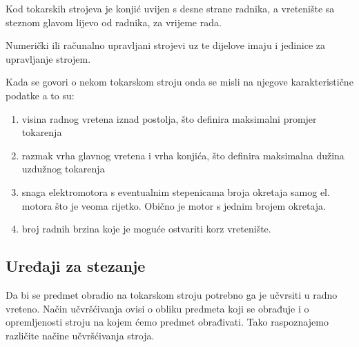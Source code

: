 \documentclass[a4paper,12pt]{article}
\numberwithin{figure}{section}
\begin{document}
Kod tokarskih strojeva je konjić uvijen s desne strane radnika, a vretenište sa steznom glavom lijevo od radnika, za vrijeme rada.\par
Numerički ili računalno upravljani strojevi uz te dijelove imaju i jedinice za upravljanje strojem. \par
Kada se govori o nekom tokarskom stroju onda se misli na njegove karakteristične podatke a to su:
\begin{enumerate}
\item visina radnog vretena iznad postolja, što definira maksimalni promjer tokarenja
\item razmak vrha glavnog vretena i vrha konjića, što definira maksimalna dužina uzdužnog tokarenja
\item snaga elektromotora s eventualnim stepenicama broja okretaja samog el. motora što je veoma rijetko. Obično je motor s jednim brojem okretaja.
\item broj radnih brzina koje je moguće ostvariti korz vretenište.
\end{enumerate}
\subsection{Uređaji za stezanje}
Da bi se predmet obradio na tokarskom stroju potrebno ga je učvrsiti u radno vreteno. Način učvršćivanja ovisi o obliku predmeta koji se obrađuje i o opremljenosti stroju na kojem ćemo predmet obrađivati. Tako raspoznajemo različite načine učvršćivanja stroja.
\clearpage
\end{document}
